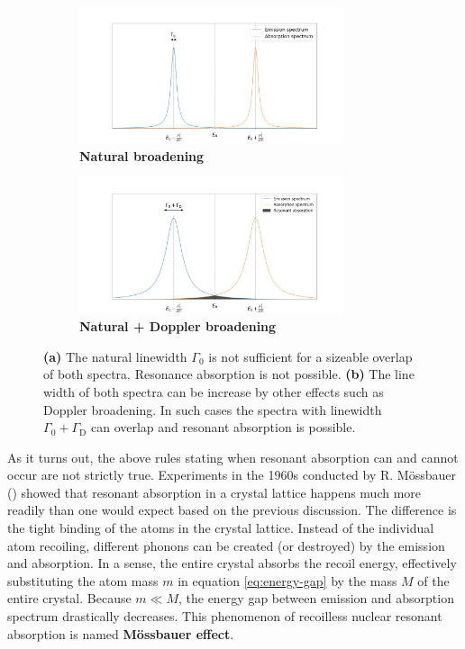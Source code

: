 \begin{figure}
	\centering
	\begin{subfigure}[h]{0.45\linewidth}
	\includegraphics[height=4.0cm]{./fig/resonance-absorption-tight.png}
	\caption{\textbf{Natural broadening}\label{fig:resonance-absorption-tight}}
	\end{subfigure}
	\hfill
	\begin{subfigure}[h]{0.45\linewidth}
	\includegraphics[height=4.0cm]{./fig/resonance-absorption-loose.png}
	\caption{\textbf{Natural + Doppler broadening}\label{fig:resonance-absorption-loose}}
	\end{subfigure}
	\caption{\textbf{(a)} The natural linewidth $\Gamma_0$ is not sufficient for
	a sizeable overlap of both spectra. Resonance absorption is not possible. 
	\textbf{(b)} The line width of both spectra can be increase by other effects 
	such as Doppler broadening. In such cases the spectra with linewidth 
	$\Gamma_0+\Gamma_\text{D}$ can overlap and resonant absorption is possible.
	\label{fig:resonant-absorption}}
\end{figure}

As it turns out, the above rules stating when resonant absorption can and cannot
occur are not strictly true. Experiments in the 1960s conducted by R. Mössbauer 
(\cite{wertheim2013mossbauer}) showed that resonant absorption in a crystal lattice
happens much more readily than one would expect based on the previous discussion.
The difference is the tight binding of the atoms in the crystal lattice. Instead of
the individual atom recoiling, different phonons can be created (or destroyed) by the
emission and absorption. In a sense, the entire crystal absorbs the recoil energy, 
effectively substituting the atom mass $m$ in equation \autoref{eq:energy-gap} by
the mass $M$ of the entire crystal. Because $m\ll M$, the energy gap between emission
and absorption spectrum drastically decreases. This phenomenon of recoilless nuclear
resonant absorption is named \textbf{Mössbauer effect}.
